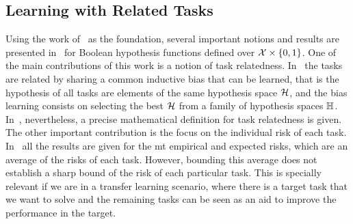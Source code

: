 
\subsection{Learning with Related Tasks} %
Using the work of~\cite{baxter2000model} as the foundation, several important notions and results are presented in~\cite{Ben-DavidB08} for Boolean hypothesis functions defined over $\mathcal{X} \times \left\{0, 1\right\}$.
One of the main contributions of this work is a notion of task relatedness. In~\cite{baxter2000model} the tasks are related by sharing a common inductive bias that can be learned, that is the hypothesis of all tasks are elements of the same hypothesis space $\mathcal{H}$, and the bias learning consists on selecting the best $\mathcal{H}$ from a family of hypothesis spaces $\mathbb{H}$. In~\cite{Ben-DavidB08}, nevertheless, a precise mathematical definition for task relatedness is given.
The other important contribution is the focus on the individual risk of each task. In~\cite{baxter2000model} all the results are given for the \acrshort{mt} empirical and expected risks, which are an average of the risks of each task. However, bounding this average does not establish a sharp bound of the risk of each particular task. This is specially relevant if we are in a transfer learning scenario, where there is a target task that we want to solve and the remaining tasks can be seen as an aid to improve the performance in the target.

